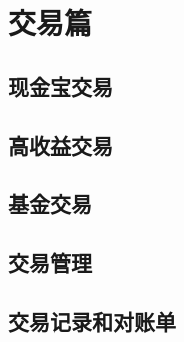 \part{交易篇}
\label{par:trade}


\clearpage
\chapter{现金宝交易} 
\label{cha:trade_mac}



\clearpage
\chapter{高收益交易} 
\label{cha:trade_vip}


\clearpage
\chapter{基金交易} 
\label{cha:trade_fund}


\clearpage
\chapter{交易管理} 
\label{cha:trade_manage}


\clearpage
\chapter{交易记录和对账单} 
\label{cha:trade_record}
